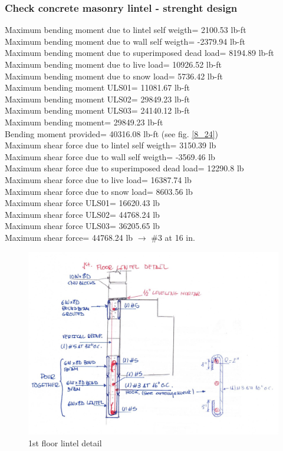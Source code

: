 \subsubsection{Check concrete masonry lintel - strenght design}
Maximum bending moment due to lintel self weigth=  2100.53 lb-ft \\
Maximum bending moment due to wall self weigth=  -2379.94 lb-ft \\
Maximum bending moment due to superimposed dead load=  8194.89 lb-ft \\
Maximum bending moment due to live load=  10926.52 lb-ft \\
Maximum bending moment due to snow load=  5736.42 lb-ft \\
Maximum bending moment ULS01=  11081.67 lb-ft \\
Maximum bending moment ULS02=  29849.23 lb-ft \\
Maximum bending moment ULS03=  24140.12 lb-ft \\
Maximum bending moment=  29849.23 lb-ft \\
Bending moment provided= 40316.08 lb-ft (see fig. \ref{8_24})\\
Maximum shear force due to lintel self weigth=  3150.39 lb \\
Maximum shear force due to wall self weigth=  -3569.46 lb \\
Maximum shear force due to superimposed dead load=  12290.8 lb \\
Maximum shear force due to live load=  16387.74 lb \\
Maximum shear force due to snow load=  8603.56 lb \\
Maximum shear force ULS01=  16620.43 lb \\
Maximum shear force ULS02=  44768.24 lb \\
Maximum shear force ULS03=  36205.65 lb \\
Maximum shear force=  44768.24 lb $\rightarrow$ \#3 at 16 in.\\

\begin{figure}
  \begin{center}
  \includegraphics[width=120mm]{results_lintels/lintels_figures/elevator_lintel_floor1_page-0001.jpg}
  \end{center}
  \caption{1st floor lintel detail}\label{elevator_lintel_floor1.jpg}
\end{figure}

